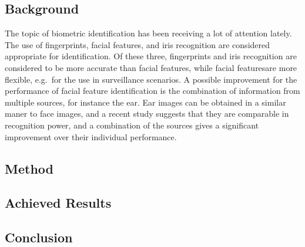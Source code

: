 \documentclass{article}
\begin{document}
\subsection{Background}
The topic of biometric identification has been receiving a lot of attention lately. %
The use of fingerprints, facial features, and iris recognition are considered appropriate for identification.
Of these three, fingerprints and iris recognition are considered to be more accurate than facial features,
while facial featuresare more flexible, e.g.\ for the use in surveillance scenarios.
A possible improvement for the performance of facial feature identification is the combination of information from multiple sources,
for instance the ear.
Ear images can be obtained in a similar maner to face images, 
and a recent study suggests that they are comparable in recognition power\cite{chang2003comparison},
and a combination of the sources gives a significant improvement over their individual performance.
\subsection{Method}
\subsection{Achieved Results}
\subsection{Conclusion}



\end{document}
